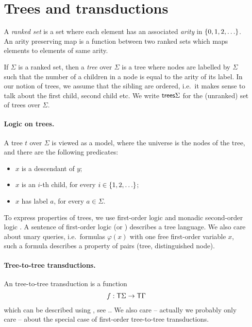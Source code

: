 \section{Trees and transductions}
\label{sec:trees-transductions}
\begin{definition}
    A \emph{ranked set} is a set where each element has an associated \emph{arity} in $\{0,1,2,\ldots\}$. An arity preserving map is a function between two ranked sets which maps elements to elements of same arity. 
\end{definition}

If $\Sigma$ is a ranked set, then a \emph{tree} over $\Sigma$ is a tree where nodes are labelled by  $\Sigma $ such that the number of a children in a node is equal to the arity of its label.
In our notion of trees, we assume that the sibling are ordered, i.e.~it makes sense to talk about the first child, second child etc. 
We write $\mathsf {trees} \Sigma$ for the (unranked) set of trees over $\Sigma$.

\paragraph*{Logic on trees.} A tree $t$ over $\Sigma$ is viewed as a model, where the universe is the nodes of the tree, and there are the following predicates:
\begin{itemize}
    \item $x$ is a descendant of $y$;
    \item $x$ is an $i$-th child, for every $i \in \{1,2,\ldots\}$;
    \item $x$ has label $a$, for every $a \in \Sigma$.
\end{itemize}
 To express properties of trees, we use first-order logic and monadic second-order logic \mso. A sentence of first-order logic (or \mso) describes a tree language. We also care about unary queries, i.e.~formulas $\varphi(x)$ with one free first-order variable $x$, such a formula describes a property of pairs (tree, distinguished node).


\paragraph*{Tree-to-tree transductions.} An \mso tree-to-tree transduction is a function
\begin{align*}
 f :    \mathsf T \Sigma \to \mathsf T \Gamma
\end{align*}
which  can be described using \mso, see .. We also care -- actually we probably only care -- about the special case of first-order tree-to-tree transductions.

